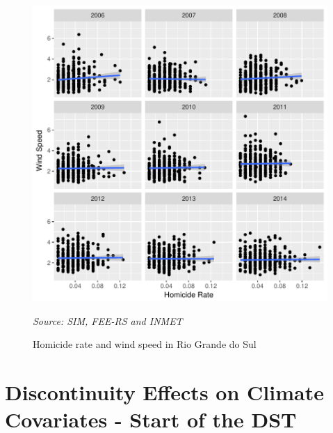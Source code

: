 \documentclass[12pt,openright,oneside,a4paper,english,french,spanish]{abntex2}
\numberwithin{table}{section} %
\numberwithin{figure}{section} %
\newcommand{\source}[1]{\textit{#1}}
\begin{document}
\begin{otherlanguage}{english}
\begin{subappendices}
\begin{figure}[H]
\begin{center}
\includegraphics{TESE_DE_DOUTORADO_RENAN_FINAL-plot_veloc_HV}
\end{center}
\caption{Homicide rate and wind speed in Rio Grande do Sul}
\source{Source: SIM, FEE-RS and INMET}
\label{fig:veloc_homicidios}
\end{figure}


\section{Discontinuity Effects on Climate Covariates - Start of the DST\label{appen:HV_efeito_cov_clima_entrada}}


\end{subappendices}
\end{otherlanguage}
\end{document}
